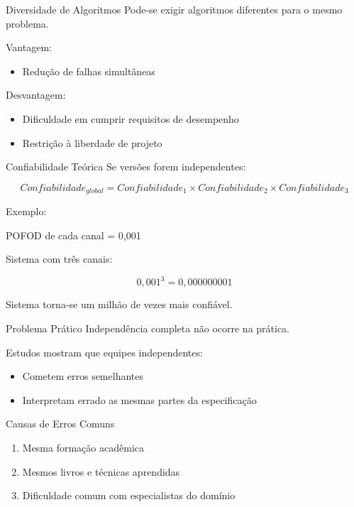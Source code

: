\documentclass[9pt]{beamer}
\begin{document}

\begin{frame}{Diversidade de Algoritmos}
Pode-se exigir algoritmos diferentes para o mesmo problema.

\bigskip

Vantagem:
\begin{itemize}
\item Redução de falhas simultâneas
\end{itemize}

Desvantagem:
\begin{itemize}
\item Dificuldade em cumprir requisitos de desempenho
\item Restrição à liberdade de projeto
\end{itemize}
\end{frame}


\begin{frame}{Confiabilidade Teórica}
Se versões forem independentes:

\[
Confiabilidade_{global} = Confiabilidade_1 \times Confiabilidade_2 \times Confiabilidade_3
\]

Exemplo:

POFOD de cada canal = 0,001

Sistema com três canais:

\[
0,001^3 = 0,000000001
\]

Sistema torna-se um milhão de vezes mais confiável.
\end{frame}


\begin{frame}{Problema Prático}
Independência completa não ocorre na prática.

Estudos mostram que equipes independentes:

\begin{itemize}
\item Cometem erros semelhantes
\item Interpretam errado as mesmas partes da especificação
\end{itemize}
\end{frame}


\begin{frame}{Causas de Erros Comuns}
\begin{enumerate}
\item Mesma formação acadêmica
\item Mesmos livros e técnicas aprendidas
\item Dificuldade comum com especialistas do domínio
\end{enumerate}
\end{frame}
\end{document}
